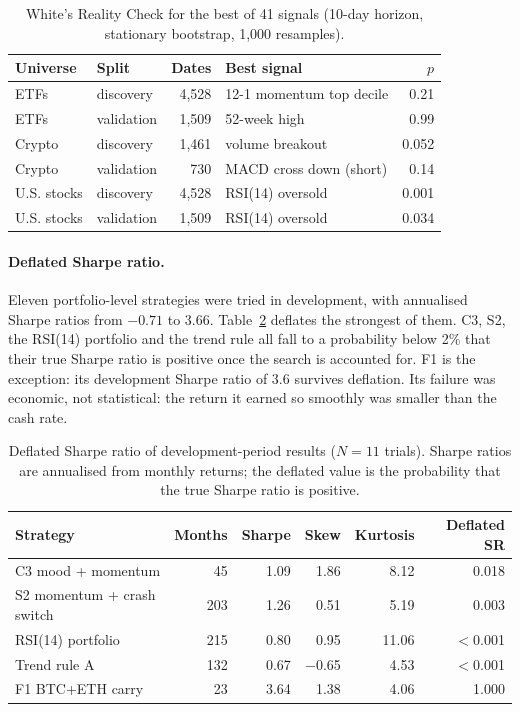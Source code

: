 \documentclass[11pt]{article}
\begin{document}
\begin{table}[h]
\centering\small
\caption{White's Reality Check for the best of 41 signals (10-day horizon, stationary bootstrap,
1,000 resamples).}\label{tab:rc}
\begin{tabular}{llrlr}
\toprule
Universe & Split & Dates & Best signal & $p$ \\
\midrule
ETFs & discovery & 4,528 & 12-1 momentum top decile & 0.21 \\
ETFs & validation & 1,509 & 52-week high & 0.99 \\
Crypto & discovery & 1,461 & volume breakout & 0.052 \\
Crypto & validation & 730 & MACD cross down (short) & 0.14 \\
U.S. stocks & discovery & 4,528 & RSI(14) oversold & 0.001 \\
U.S. stocks & validation & 1,509 & RSI(14) oversold & 0.034 \\
\bottomrule
\end{tabular}
\end{table}

\paragraph{Deflated Sharpe ratio.} Eleven portfolio-level strategies were tried in development, with
annualised Sharpe ratios from $-0.71$ to $3.66$. Table~\ref{tab:dsr} deflates the strongest of them.
C3, S2, the RSI(14) portfolio and the trend rule all fall to a probability below 2\% that their true
Sharpe ratio is positive once the search is accounted for. F1 is the exception: its development
Sharpe ratio of 3.6 survives deflation. Its failure was economic, not statistical: the return it
earned so smoothly was smaller than the cash rate.

\begin{table}[h]
\centering\small
\caption{Deflated Sharpe ratio of development-period results ($N=11$ trials). Sharpe ratios are
annualised from monthly returns; the deflated value is the probability that the true Sharpe ratio is
positive.}\label{tab:dsr}
\begin{tabular}{lrrrrr}
\toprule
Strategy & Months & Sharpe & Skew & Kurtosis & Deflated SR \\
\midrule
C3 mood + momentum & 45 & 1.09 & 1.86 & 8.12 & 0.018 \\
S2 momentum + crash switch & 203 & 1.26 & 0.51 & 5.19 & 0.003 \\
RSI(14) portfolio & 215 & 0.80 & 0.95 & 11.06 & $<$0.001 \\
Trend rule A & 132 & 0.67 & $-$0.65 & 4.53 & $<$0.001 \\
F1 BTC+ETH carry & 23 & 3.64 & 1.38 & 4.06 & 1.000 \\
\bottomrule
\end{tabular}
\end{table}
\end{document}
